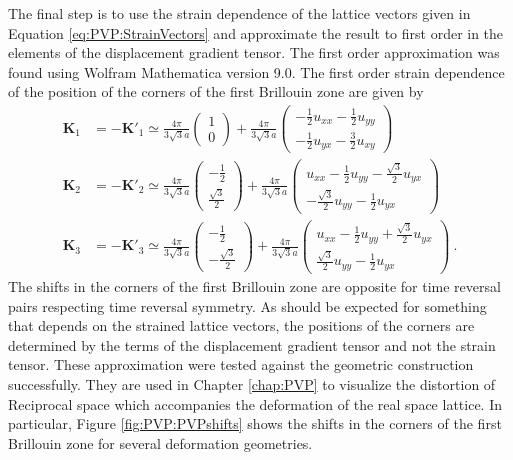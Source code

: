 The final step is to use the strain dependence of the lattice vectors given in Equation \ref{eq:PVP:StrainVectors} and approximate the result to first order in the elements of the displacement gradient tensor.
The first order approximation was found using Wolfram Mathematica version 9.0.
The first order strain dependence of the position of the corners of the first Brillouin zone are given by 
\begin{align*}
	\bm{K}_1&=-\bm{K'}_1\simeq 
		\frac{4 \pi}{3 \sqrt{3} a} \left( \begin{array}{cc} 1 \\ 0 \end{array} \right)
		+
		\frac{4 \pi}{3 \sqrt{3} a} \left( \begin{array}{cc}
		-\frac{1}{2} u_{xx}-\frac{1}{2}u_{yy} \\
		-\frac{1}{2} u_{yx} - \frac{3}{2} u_{xy}
		\end{array} \right) \\
	\bm{K}_2&=-\bm{K'}_2\simeq 
		\frac{4 \pi}{3 \sqrt{3} a} \left( \begin{array}{cc} -\frac{1}{2} \\ \frac{\sqrt{3}}{2} \end{array} \right)
		+
		\frac{4 \pi}{3 \sqrt{3} a} \left( \begin{array}{cc}
		u_{xx}-\frac{1}{2}u_{yy}-\frac{\sqrt{3}}{2} u_{yx} \\
		-\frac{\sqrt{3}}{2} u_{yy}-\frac{1}{2}u_{yx}
		\end{array} \right) 	\\
	\bm{K}_3&=-\bm{K'}_3\simeq 
		\frac{4 \pi}{3 \sqrt{3} a} \left( \begin{array}{cc} -\frac{1}{2} \\ -\frac{\sqrt{3}}{2} \end{array} \right)
		+
		\frac{4 \pi}{3 \sqrt{3} a} \left( \begin{array}{cc}
		u_{xx}-\frac{1}{2}u_{yy}+\frac{\sqrt{3}}{2} u_{yx} \\
		\frac{\sqrt{3}}{2}u_{yy}-\frac{1}{2} u_{yx}
		\end{array} \right) \ .
\end{align*}
The shifts in the corners of the first Brillouin zone are opposite for time reversal pairs respecting time reversal symmetry.
As should be expected for something that depends on the strained lattice vectors, the positions of the corners are determined by the terms of the displacement gradient tensor and not the strain tensor.
These approximation were tested against the geometric construction successfully.
They are used in Chapter \ref{chap:PVP} to visualize the distortion of Reciprocal space which accompanies the deformation of the real space lattice.
In particular, Figure \ref{fig:PVP:PVPshifts} shows the shifts in the corners of the first Brillouin zone for several deformation geometries.